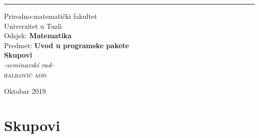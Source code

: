 \documentclass[a4paper,14pt,svgnames]{article}
\makeatletter
\renewcommand{\contentsname}{Sadržaj}
\renewcommand\tableofcontents{%
  \section*{\centerline{\MakeUppercase{\contentsname}}
    \@mkboth
      {\MakeUppercase\contentsname}
      {\MakeUppercase\contentsname}
  }%
  \@starttoc{toc}%
}
\makeatother
\begin{document}
\begin{titlepage}
\raggedright
\rule{1pt}{\textheight}
\hspace{0.05\textwidth}
\parbox[b]{0.75\textwidth}{

{\large{Prirodno-matematički fakultet\\
Univerzitet u Tuzli\\
Odsjek: \textbf{Matematika}\\
Predmet: \textbf{Uvod u programske pakete}}}\\[7\baselineskip]
{\Huge\bfseries Skupovi}\\[1\baselineskip]
{\large\textit{-seminarski rad-}}\\[5\baselineskip]
{\Large\textsc{halilović adis}}

\vspace{0.5\textheight}

{\noindent Oktobar 2019}\\[\baselineskip]
}
\end{titlepage}

\hoffset -0.5cm
\thispagestyle{empty}
\pagecolor{gray}
\restoregeometry
\pagecolor{white}

\newpage

\section{Skupovi}
\end{document}
